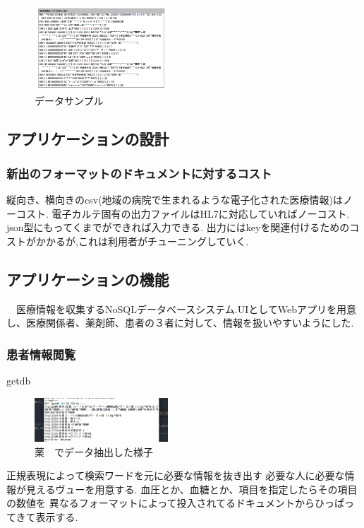 	\begin{figure}[htbp]
		\begin{center}
			\includegraphics[width=5cm, bb=0 0 437 688]{ss-mix_sampledata.png}
		\end{center}
		\caption{データサンプル}
		\label{ss-mix_sampledata}
	\end{figure}

\subsection{アプリケーションの設計}

	\subsubsection{新出のフォーマットのドキュメントに対するコスト}
	縦向き、横向きのcsv(地域の病院で生まれるような電子化された医療情報)はノーコスト.
	電子カルテ固有の出力ファイルはHL7に対応していればノーコスト.
	json型にもってくまでができれば入力できる.
	出力にはkeyを関連付けるためのコストがかかるが,これは利用者がチューニングしていく.


\subsection{アプリケーションの機能}
　医療情報を収集するNoSQLデータベースシステム.UIとしてWebアプリを用意し、医療関係者、薬剤師、患者の３者に対して、情報を扱いやすいようにした.

	\subsubsection{患者情報閲覧}
		getdb
		\\
		\begin{figure}[htbp]
				\includegraphics[width=5cm, bb=0 0 437 688]{./gazou/getdb.png}
			\caption{薬　でデータ抽出した様子}
			\label{ss-mix_sampledata}
		\end{figure}
		正規表現によって検索ワードを元に必要な情報を抜き出す
		必要な人に必要な情報が見えるヴューを用意する.
		血圧とか、血糖とか、項目を指定したらその項目の数値を
		異なるフォーマットによって投入されてるドキュメントからひっぱってきて表示する.

